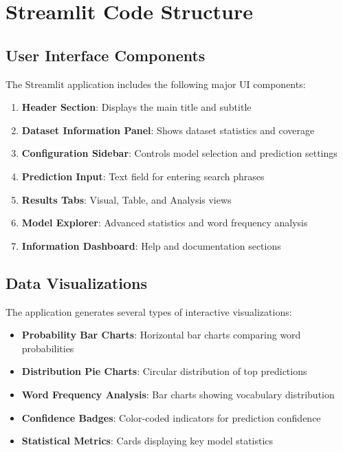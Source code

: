 \documentclass[12pt,a4paper]{report}
\begin{document}
\section{Streamlit Code Structure}

\subsection{User Interface Components}

The Streamlit application includes the following major UI components:

\begin{enumerate}
    \item \textbf{Header Section}: Displays the main title and subtitle
    \item \textbf{Dataset Information Panel}: Shows dataset statistics and coverage
    \item \textbf{Configuration Sidebar}: Controls model selection and prediction settings
    \item \textbf{Prediction Input}: Text field for entering search phrases
    \item \textbf{Results Tabs}: Visual, Table, and Analysis views
    \item \textbf{Model Explorer}: Advanced statistics and word frequency analysis
    \item \textbf{Information Dashboard}: Help and documentation sections
\end{enumerate}

\subsection{Data Visualizations}

The application generates several types of interactive visualizations:

\begin{itemize}
    \item \textbf{Probability Bar Charts}: Horizontal bar charts comparing word probabilities
    \item \textbf{Distribution Pie Charts}: Circular distribution of top predictions
    \item \textbf{Word Frequency Analysis}: Bar charts showing vocabulary distribution
    \item \textbf{Confidence Badges}: Color-coded indicators for prediction confidence
    \item \textbf{Statistical Metrics}: Cards displaying key model statistics
\end{itemize}
\end{document}
